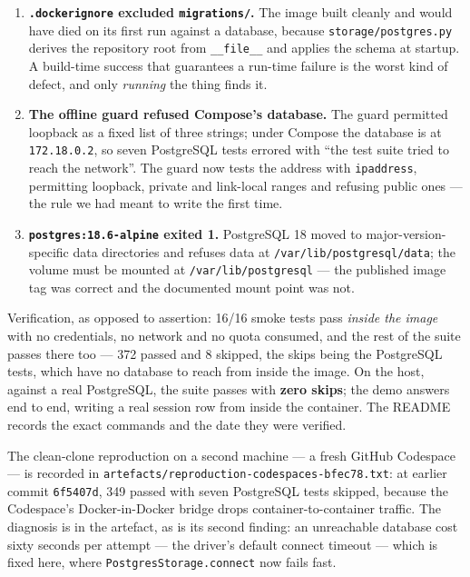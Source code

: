 \documentclass[10pt,a4paper]{article}
\begin{document}
\begin{enumerate}[leftmargin=1.6em,itemsep=0.2em]
  \item \textbf{\texttt{.dockerignore} excluded \texttt{migrations/}.} The image built cleanly
        and would have died on its first run against a database, because
        \texttt{storage/postgres.py} derives the repository root from \texttt{\_\_file\_\_} and
        applies the schema at startup. A build-time success that guarantees a run-time failure
        is the worst kind of defect, and only \emph{running} the thing finds it.
  \item \textbf{The offline guard refused Compose's database.} The guard permitted loopback as a
        fixed list of three strings; under Compose the database is at \texttt{172.18.0.2}, so
        seven PostgreSQL tests errored with ``the test suite tried to reach the network''. The
        guard now tests the address with \texttt{ipaddress}, permitting loopback, private and
        link-local ranges and refusing public ones --- the rule we had meant to write the first
        time.
  \item \textbf{\texttt{postgres:18.6-alpine} exited 1.} PostgreSQL 18 moved to
        major-version-specific data directories and refuses data at
        \texttt{/var/lib/postgresql/data}; the volume must be mounted at
        \texttt{/var/lib/postgresql} --- the published image tag was correct and the documented
        mount point was not.
\end{enumerate}

Verification, as opposed to assertion: 16/16 smoke tests pass \emph{inside the image} with no
credentials, no network and no quota consumed, and the rest of the suite passes there too ---
372 passed and 8 skipped, the skips being the PostgreSQL tests, which have no database to reach
from inside the image. On the host, against a real PostgreSQL, the suite passes with
\textbf{zero skips}; the demo answers end to end, writing a real session row from inside the
container. The README records the exact commands and the date they were verified.

The clean-clone reproduction on a second machine — a fresh GitHub Codespace —
is recorded in \texttt{artefacts/reproduction-codespaces-bfec78.txt}: at earlier commit
\texttt{6f5407d}, 349 passed with seven
PostgreSQL tests skipped, because the Codespace's Docker-in-Docker bridge drops
container-to-container traffic. The diagnosis is in the artefact, as is its second finding:
an unreachable database cost sixty seconds per attempt — the driver's default connect timeout
— which is fixed here, where \texttt{PostgresStorage.connect} now fails fast.
\end{document}
